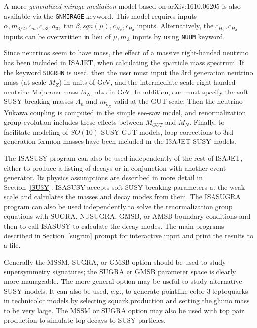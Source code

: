 A more {\it generalized mirage mediation} model based on arXiv:1610.06205
is also available via the \verb|GNMIRAGE| keyword. This model requires
inputs $\alpha ,m_{3/2},c_m,c_{m3},a_3,\tan\beta ,sgn( \mu ),c_{H_u},c_{H_d}$ 
inputs. Alternatively, the $c_{H_u},c_{H_d}$ inputs can be overwritten 
in lieu of $\mu ,m_A$ inputs by using \verb|NUHM| keyword.

\medskip

     Since neutrinos seem to have mass, the effect of a massive
right-handed neutrino has been included in ISAJET, when calculating the
sparticle mass spectrum. If the keyword \verb|SUGRHN| is used, then the
user must input the 3rd generation neutrino mass (at scale $M_Z$) in
units of GeV, and the intermediate scale right handed neutrino Majorana
mass $M_N$, also in GeV. In addition, one must specify the soft
SUSY-breaking masses $A_n$ and $m_{\tilde\nu_R}$ valid at the GUT scale.
Then the neutrino Yukawa coupling is computed in the simple see-saw
model, and renormalization group evolution includes these effects
between $M_{GUT}$ and $M_N$. Finally, to facilitate modeling of $SO(10)$
SUSY-GUT models, loop corrections to 3rd generation fermion masses have
been included in the ISAJET SUSY models.

\bigskip\bigskip

      The ISASUSY program can also be used independently of the rest of
ISAJET, either to produce a listing of decays or in conjunction with
another event generator. Its physics assumptions are described in more
detail in Section~\ref{SUSY}. ISASUSY accepts soft SUSY breaking
parameters at the weak scale and calculates the masses and decay modes
from them. The ISASUGRA program can also be used independently to solve
the renormalization group equations with SUGRA, NUSUGRA, GMSB, or AMSB
boundary conditions and then to call ISASUSY to calculate the decay
modes. The main programs described in Section~\ref{sugrun} prompt for
interactive input and print the results to a file.

      Generally the MSSM, SUGRA, or GMSB option should be used to study
supersymmetry signatures; the SUGRA or GMSB parameter space is clearly
more manageable. The more general option may be useful to study
alternative SUSY models. It can also be used, e.g., to generate
pointlike color-3 leptoquarks in technicolor models by selecting squark
production and setting the gluino mass to be very large. The MSSM or
SUGRA option may also be used with top pair production to simulate top
decays to SUSY particles.

